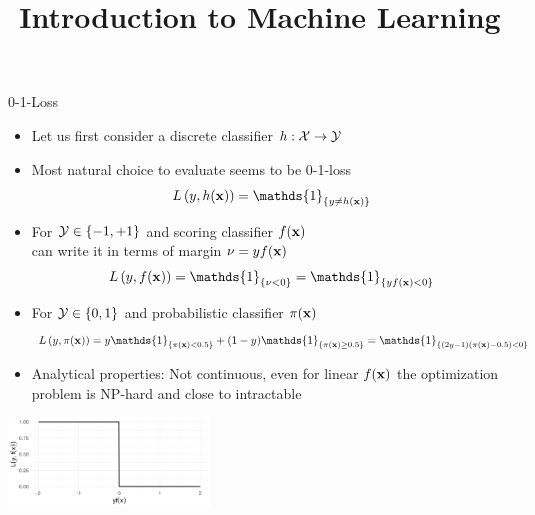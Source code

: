 \documentclass[11pt,compress,t,notes=noshow, xcolor=table]{beamer}
\title{Introduction to Machine Learning}
\begin{document}
    

\begin{vbframe}{0-1-Loss}

\begin{itemize}
\footnotesize
  \item Let us first consider a discrete classifier $h: \mathcal{X} \to \mathcal{Y}$
  \item Most natural choice to evaluate seems to be 0-1-loss 
    $$
  \Lhxy = \mathds{1}_{\{y \ne \hx\}} 
  $$
  \item For $\mathcal{Y} \in \{-1, +1\}$ and scoring classifier $f(\mathbf{x})$\\
  can write it in terms of margin $\nu = yf(\mathbf{x})$
  $$
  \Lxy = \mathds{1}_{\{\nu < 0\}} = \mathds{1}_{\{y\fx < 0\}}
  $$
  \item For $\mathcal{Y} \in \{0, 1\}$ and probabilistic classifier $\pi(\mathbf{x})$
$$
\Lpixy = y \mathds{1}_{\{\pix < 0.5\}} + (1-y) \mathds{1}_{\{\pix \geq 0.5\}} = \mathds{1}_{\{(2y-1)(\pix - 0.5) < 0 \}} 
$$
  
  \item Analytical properties:  Not continuous, even for linear $f(\mathbf{x})$ the optimization problem is NP-hard and close to intractable 
\end{itemize}

\begin{center}
\includegraphics[width = 0.4\textwidth]{figure/zero_one.png}
\end{center}

\end{vbframe}
\end{document}
